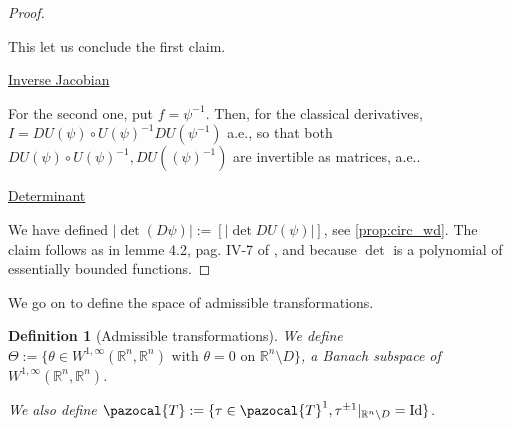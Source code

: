 \documentclass[english,a4paper,10pt,oneside]{scrbook}	%
\theoremstyle{break}
\newtheorem{defn}[equation]{Definition}
\newenvironment{mproof}[1][\proofname]{%
  \begin{proof}[#1]$ $\par\nobreak\ignorespaces
}{%
  \end{proof}
}
\renewcommand*{\proofname}{Proof}
\theoremstyle{remark}
\newcommand{\mR}{\mathbb{R}}
\newcommand{\cT}{\pazocal{T}}
\newcommand{\id}{\text{Id}}
\begin{document}
\begin{mproof}
This let us conclude the first claim.

\underline{Inverse Jacobian}

For the second one, put $f = \psi^{-1}$. Then, for the classical derivatives, $I = DU(\psi)\circ U(\psi)^{-1} DU(\psi^{-1})$ a.e., so that both $DU(\psi)\circ U(\psi)^{-1}, DU((\psi)^{-1})$ are invertible as matrices, a.e.. 

\underline{Determinant}

We have defined $|\det(D\psi)|:=[|\det DU(\psi)|]$, see \cref{prop:circ_wd}. The claim follows as in lemme 4.2, pag. IV-7 of \cite{murat}, and because $\det$ is a polynomial of essentially bounded functions.

\end{mproof}

We go on to define the space of admissible transformations.

\begin{defn}[Admissible transformations]
\label{def:adm}
We define $\Theta:=\{\theta \in W^{1,\infty}(\mR^n,\mR^n) \text{ with } \theta=0 \text{ on } \mR^n \setminus D\}$, a Banach subspace of $ W^{1,\infty}(\mR^n,\mR^n)$.


We also define $\cT:=\{\tau \in \cT^1, \tau^{\pm 1}|_{\mR^n\setminus D}=\id\}$. 

\end{defn}
\end{document}
